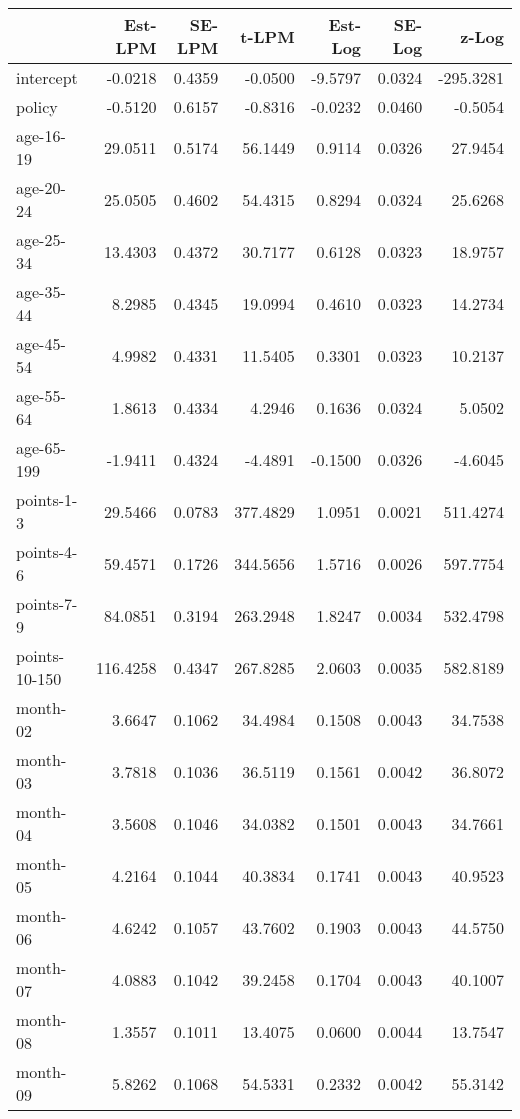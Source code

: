\documentclass[10pt]{article}
\begin{document}
\begin{table}[ht]
\centering
\begin{tabular}{lrrrrrr}
  \hline
 & Est-LPM & SE-LPM & t-LPM & Est-Log & SE-Log & z-Log \\ 
  \hline
intercept & -0.0218 & 0.4359 & -0.0500 & -9.5797 & 0.0324 & -295.3281 \\ 
  policy & -0.5120 & 0.6157 & -0.8316 & -0.0232 & 0.0460 & -0.5054 \\ 
  age-16-19 & 29.0511 & 0.5174 & 56.1449 & 0.9114 & 0.0326 & 27.9454 \\ 
  age-20-24 & 25.0505 & 0.4602 & 54.4315 & 0.8294 & 0.0324 & 25.6268 \\ 
  age-25-34 & 13.4303 & 0.4372 & 30.7177 & 0.6128 & 0.0323 & 18.9757 \\ 
  age-35-44 & 8.2985 & 0.4345 & 19.0994 & 0.4610 & 0.0323 & 14.2734 \\ 
  age-45-54 & 4.9982 & 0.4331 & 11.5405 & 0.3301 & 0.0323 & 10.2137 \\ 
  age-55-64 & 1.8613 & 0.4334 & 4.2946 & 0.1636 & 0.0324 & 5.0502 \\ 
  age-65-199 & -1.9411 & 0.4324 & -4.4891 & -0.1500 & 0.0326 & -4.6045 \\ 
  points-1-3 & 29.5466 & 0.0783 & 377.4829 & 1.0951 & 0.0021 & 511.4274 \\ 
  points-4-6 & 59.4571 & 0.1726 & 344.5656 & 1.5716 & 0.0026 & 597.7754 \\ 
  points-7-9 & 84.0851 & 0.3194 & 263.2948 & 1.8247 & 0.0034 & 532.4798 \\ 
  points-10-150 & 116.4258 & 0.4347 & 267.8285 & 2.0603 & 0.0035 & 582.8189 \\ 
  month-02 & 3.6647 & 0.1062 & 34.4984 & 0.1508 & 0.0043 & 34.7538 \\ 
  month-03 & 3.7818 & 0.1036 & 36.5119 & 0.1561 & 0.0042 & 36.8072 \\ 
  month-04 & 3.5608 & 0.1046 & 34.0382 & 0.1501 & 0.0043 & 34.7661 \\ 
  month-05 & 4.2164 & 0.1044 & 40.3834 & 0.1741 & 0.0043 & 40.9523 \\ 
  month-06 & 4.6242 & 0.1057 & 43.7602 & 0.1903 & 0.0043 & 44.5750 \\ 
  month-07 & 4.0883 & 0.1042 & 39.2458 & 0.1704 & 0.0043 & 40.1007 \\ 
  month-08 & 1.3557 & 0.1011 & 13.4075 & 0.0600 & 0.0044 & 13.7547 \\ 
  month-09 & 5.8262 & 0.1068 & 54.5331 & 0.2332 & 0.0042 & 55.3142 \\ 

\end{tabular}
\end{table}
\end{document}

